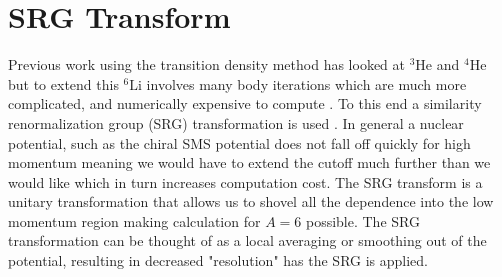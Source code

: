 \documentclass[a4paper,11pt]{article}
\newcommand{\LiS}{{}^{6} \mathrm{Li} }
\newcommand{\HeF}{{}^{4} \mathrm{He}}
\newcommand{\HeT}{{}^{3} \mathrm{He}}
\begin{document}
\section{SRG Transform}
Previous work using the transition density method has looked at
$\HeT$ and $\HeF$ but to extend this $\LiS$ involves many body
iterations which are much more complicated, and numerically expensive
to compute \cite{hammer2020, hammer4He}.
To this end a similarity renormalization group (SRG) transformation
is used \cite{SRG}.
In general a nuclear potential, such as the chiral SMS potential does
not fall off quickly for high momentum meaning we would have to
extend the cutoff much further than we would like which in turn
increases computation cost.
The SRG transform is a unitary transformation that allows us to
shovel all the dependence into the low momentum region making
calculation for $A=6$ possible.
The SRG transformation can be thought of as a local averaging or
smoothing out of the potential, resulting in decreased "resolution"
has the SRG is applied.
\end{document}
